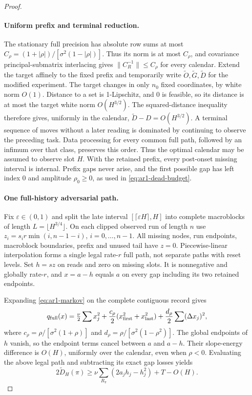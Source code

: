\begin{proof}
\paragraph{Uniform prefix and terminal reduction.}
The stationary full precision has absolute row sums at most
$C_\rho=(1+|\rho|)/[\sigma^2(1-|\rho|)]$. Thus its norm is at most
$C_\rho$, and covariance principal-submatrix interlacing gives
$\|C_R^{-1}\|\le C_\rho$ for every calendar.
Extend the target affinely to the fixed prefix and temporarily write
$\widetilde O,\widetilde G,\widetilde D$ for the modified experiment.
The target changes in only $n_0$ fixed coordinates, by white norm $O(1)$.
Distance to a set is 1-Lipschitz, and $0$ is feasible, so its distance is
at most the target white norm $O(H^{3/2})$.
The squared-distance inequality therefore gives, uniformly in the calendar,
$\widetilde D-D=O(H^{3/2})$.
A terminal sequence of moves without a later reading is dominated by
continuing to observe the preceding task. Data processing for every common
full path, followed by an infimum over that class, preserves this order.
Thus the optimal calendar may be assumed to observe slot $H$.
With the retained prefix, every post-onset missing interval is internal.
Prefix gaps never arise, and the first possible gap has left index $0$ and
amplitude $\rho_0\ge0$, as used in \eqref{eq:ar1-dead-budget}.

\paragraph{One full-history adversarial path.}
Fix $\varepsilon\in(0,1)$ and split the late interval
$[\lceil\varepsilon H\rceil,H]$ into complete macroblocks of length
$L=\lfloor H^{3/4}\rfloor$. On each clipped observed run of length $n$ use
$z_i=s_i r\min(i,n-1-i)$, $i=0,\ldots,n-1$.
All missing nodes, run endpoints, macroblock boundaries, prefix and unused
tail have $z=0$. Piecewise-linear interpolation forms a single legal
rate-$r$ full path, not separate paths with reset levels.
Set $h=s z$ on reads and zero on missing slots.
It is nonnegative and globally rate-$r$, and $x=a-h$ equals $a$ on every gap
including its two retained endpoints.

Expanding \eqref{eq:ar1-markov} on the complete contiguous record gives
\begin{equation}\label{eq:ar1-full-energy}
 q_{\rm full}(x)=\tfrac\nu2\sum x_j^2
 +\frac{c_\rho}{2}(x_{\rm first}^2+x_{\rm last}^2)
 +\frac{d_\rho}{2}\sum(\Delta x_j)^2,
\end{equation}
where $c_\rho=\rho/[\sigma^2(1+\rho)]$ and
$d_\rho=\rho/[\sigma^2(1-\rho^2)]$.
The global endpoints of $h$ vanish, so the endpoint terms cancel between
$a$ and $a-h$. Their slope-energy difference is $O(H)$, uniformly over
the calendar, even when $\rho<0$.
Evaluating the above legal path and subtracting its exact gap losses yields
\begin{equation}\label{eq:ar1-adversarial}
 2\widetilde D_H(\pi)\ge
 \nu\sum_{R_\pi}(2a_jh_j-h_j^2)+T-O(H).
\end{equation}


\end{proof}
